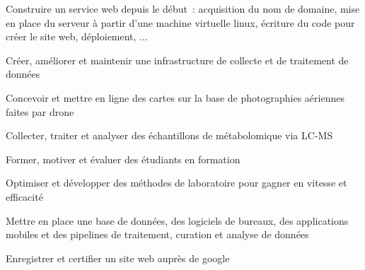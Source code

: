

\begin{cvskills}

  \begin{minipage}[t]{0.45\textwidth}
    \cvskill
      {Construire un service web depuis le début : acquisition du nom de domaine, mise en place du serveur à partir d’une machine virtuelle linux, écriture du code pour créer le site web, déploiement, ...}
  \end{minipage}\hfill
  \begin{minipage}[t]{0.45\textwidth}
    \cvskill
      {Créer, améliorer et maintenir une infrastructure de collecte et de traitement de données}
  \end{minipage}

  \begin{minipage}[t]{0.45\textwidth}
    \cvskill
      {Concevoir et mettre en ligne des cartes sur la base de photographies aériennes faites par drone}
  \end{minipage}\hfill
  \begin{minipage}[t]{0.45\textwidth}
    \cvskill
      {Collecter, traiter et analyser des échantillons de métabolomique via LC-MS}
  \end{minipage}

  \begin{minipage}[t]{0.45\textwidth}
    \cvskill
      {Former, motiver et évaluer des étudiants en formation}
  \end{minipage}\hfill
  \begin{minipage}[t]{0.45\textwidth}
    \cvskill
      {Optimiser et développer des méthodes de laboratoire pour gagner en vitesse et efficacité}
  \end{minipage}

  \begin{minipage}[t]{0.45\textwidth}
    \cvskill
      {Mettre en place une base de données, des logiciels de bureaux, des applications mobiles et des pipelines de traitement, curation et analyse de données}
  \end{minipage}\hfill
  \begin{minipage}[t]{0.45\textwidth}
    \cvskill
      {Enregistrer et certifier un site web auprès de google}
  \end{minipage}

\end{cvskills}